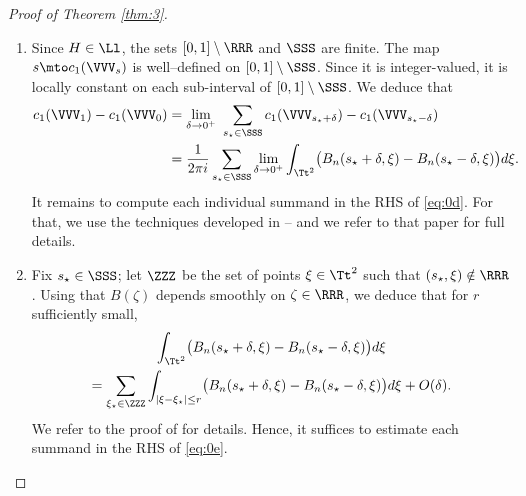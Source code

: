 \begin{proof}[Proof of Theorem \ref{thm:3}]
\begin{enumerate}
In Step 6, we will use the space of $2 \times 2$ traceless Hermitian matrices $\EE_0$. This space is equipped with the Hermitian inner product $\lr{T_1,T_2} = \Tr(T_1T_2)$; the Pauli matrices $\sigma_1, \sigma_2, \sigma_3$ form an orthonormal basis. If $\tsigma_1, \tsigma_2, \tsigma_3$ is another orthonormal basis, then there exists $U \in SU(2)$ (unique up to multiplication by $\pm \Id_2$) and $\epsilon \in \{\pm 1\}$ such that
\begin{equation}\label{eq:0h}
\tsigma_k = \epsilon \cdot U \sigma_k U^*, \quad 1 \leq k \leq 3.
\end{equation}
This is precisely the content of the isomorphism between $SU(2) / \{\pm \Id_2\}$ and $SO(3)$; see \eg \cite[\S4.2]{S05}. The number $\epsilon \in \{\pm 1\}$ reads as the determinant of the (orthogonal) matrix of the basis $(\tsigma_1, \tsigma_2, \tsigma_3)$ in the basis $(\sigma_1, \sigma_2, \sigma_3)$.

\item
Since $H \in \Ll$, the sets $[0,1] \setminus \RRR$ and $\SSS$ are finite. The map $s \mto c_1(\VVV_s)$ is well--defined on $[0,1] \setminus \SSS$. Since it is integer-valued, it is locally constant on each sub-interval of $[0,1] \setminus \SSS$. We deduce that
\begin{equation}\label{eq:0d}
\begin{split}
c_1(\VVV_1) - c_1(\VVV_0) &= \lim_{\delta \to 0^+} \ \sum_{s_\star \in \SSS} c_1(\VVV_{s_\star+\delta}) - c_1(\VVV_{s_\star-\delta})
\\
&= \dfrac{1}{2\pi i} \sum_{s_\star \in \SSS} \lim_{\delta \to 0^+} \int_{\Tt^2} \bigl(B_n(s_\star+\delta,\xi) - B_n(s_\star-\delta,\xi) \bigr) d\xi.
\end{split}
\end{equation}
It remains to compute each individual summand in the RHS of \eqref{eq:0d}. For that, we use the techniques developed in \cite[\S2]{D19b} -- and we refer to that paper for full details.

\item
Fix $s_\star \in \SSS$; let $\ZZZ$ be the set of points $\xi \in \Tt^2$ such that $(s_\star,\xi) \notin \RRR$. Using that $B(\zeta)$ depends smoothly on $\zeta \in \RRR$, we deduce that for $r$ sufficiently small,
\begin{multline}\label{eq:0e}
\int_{\Tt^2} \bigl(B_n(s_\star+\delta,\xi) - B_n(s_\star-\delta,\xi) \bigr) d\xi\\
= \sum_{\xi_\star \in \ZZZ} \int_{|\xi-\xi_\star| \leq r} \bigl(B_n(s_\star+\delta,\xi) - B_n(s_\star-\delta,\xi) \bigr) d\xi + O(\delta).
\end{multline}
We refer to the proof of \cite[Lem.\,2.1]{D19b} for details. Hence, it suffices to estimate each summand in the RHS of \eqref{eq:0e}.


\end{enumerate}
\end{proof}
